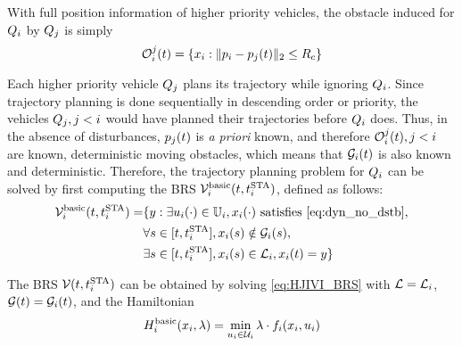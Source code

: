 With full position information of higher priority vehicles, the obstacle induced for $Q_i$ by $Q_j$ is simply
\begin{equation}
\label{eq:ioset_basic}
\ioset_i^j(t) = \{\state_i: \|\pos_i - \pos_j(t)\|_2 \le \rc \}
\end{equation}

Each higher priority vehicle $Q_j$ plans its trajectory while ignoring $Q_i$. Since trajectory planning is done sequentially in descending order or priority, the vehicles $Q_j, j<i$ would have planned their trajectories before $Q_i$ does. Thus, in the absence of disturbances, $p_j(t)$ is \textit{a priori} known, and therefore $\mathcal{O}_i^j(t), j<i$ are known, deterministic moving obstacles, which means that $\mathcal{G}_i(t)$ is also known and deterministic. Therefore, the trajectory planning problem for $Q_i$ can be solved by first computing the BRS $\mathcal{V}_i^\text{basic}(t, t^\text{STA}_i)$, defined as follows:
\begin{equation}
\label{eq:BRS_basic}
\begin{aligned}
\brs_i^\text{basic}(t, \sta_i) = & \{y: \exists \ctrl_i(\cdot) \in \cfset_i, \state_i(\cdot) \text{ satisfies \eqref{eq:dyn_no_dstb}}, \\
& \forall s \in [t, \sta_i],\state_i(s) \notin \obsset_i(s), \\
& \exists s \in [t, \sta_i], \state_i(s) \in \targetset_i, \state_i(t) = y\}
\end{aligned}
\end{equation}

The BRS $\mathcal{V}(t, t^\text{STA}_i)$ can be obtained by solving \eqref{eq:HJIVI_BRS} with $\mathcal{L} = \mathcal{L}_i$, $\mathcal{G}(t) = \mathcal{G}_i(t)$, and the Hamiltonian 
\begin{equation}
\label{eq:basicham}
\ham_i^\text{basic}(\state_i, \costate) = \min_{\ctrl_i\in\cset_i} \costate \cdot \fdyn_i(\state_i, \ctrl_i)
\end{equation}

